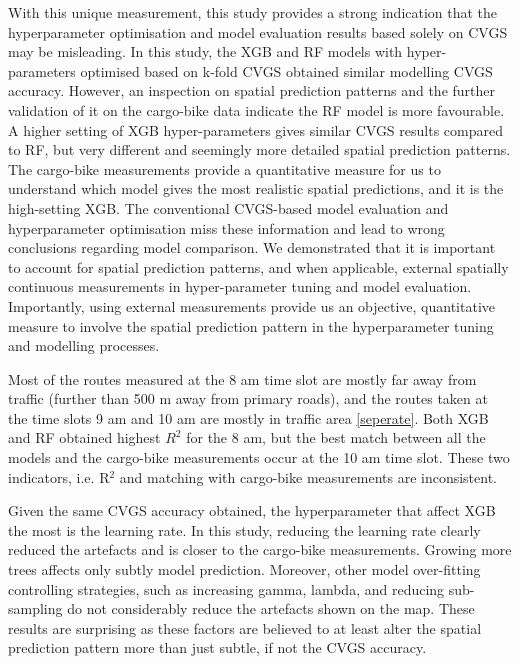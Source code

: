 \documentclass{article}
\begin{document}
With this unique measurement, this study provides a strong indication that the hyperparameter optimisation and model evaluation results based solely on CVGS may be misleading. In this study, the XGB and RF models with hyper-parameters optimised based on k-fold CVGS obtained similar modelling CVGS accuracy. However, an inspection on spatial prediction patterns and the further validation of it on the cargo-bike data indicate the RF model is more favourable. A higher setting of XGB hyper-parameters gives similar CVGS results compared to RF, but very different and seemingly more detailed spatial prediction patterns. The cargo-bike measurements provide a quantitative measure for us to understand which model gives the most realistic spatial predictions, and it is the high-setting XGB. The conventional CVGS-based model evaluation and hyperparameter optimisation miss these information and lead to wrong conclusions regarding model comparison. We demonstrated that it is important to account for spatial prediction patterns, and when applicable, external spatially continuous measurements in hyper-parameter tuning and model evaluation. Importantly, using external measurements provide us an objective, quantitative measure to involve the spatial prediction pattern in the hyperparameter tuning and modelling processes. 

Most of the routes measured at the 8 am time slot are mostly far away from traffic (further than 500 m away from primary roads), and the routes taken at the time slots 9 am and 10 am are mostly in traffic area \cref{seperate}. Both XGB and RF obtained highest $R^2$ for the 8 am, but the best match between all the models and the cargo-bike measurements occur at the 10 am time slot. These two indicators, i.e. R$^2$ and matching with cargo-bike measurements are inconsistent.   

Given the same CVGS accuracy obtained, the hyperparameter that affect XGB the most is the learning rate. In this study, reducing the learning rate clearly reduced the artefacts and is closer to the cargo-bike measurements. Growing more trees affects only subtly model prediction. Moreover, other model over-fitting controlling strategies, such as increasing gamma, lambda, and reducing sub-sampling do not considerably reduce the artefacts shown on the map. These results are surprising as these factors are believed to at least alter the spatial prediction pattern more than just subtle, if not the CVGS accuracy.        
\end{document}
